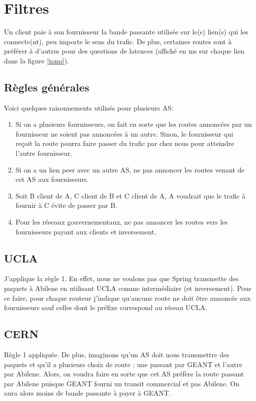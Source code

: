 \documentclass[a4paper, 12pt]{article}
\begin{document}
\section{Filtres}
Un client paie à son fournisseur la bande passante utilisée sur le(s) lien(s) qui les connecte(nt), peu importe le sens du trafic.
De plus, certaines routes sont à préférer à d'autres pour des questions de latences (affiché en ms sur chaque lien dans la figure \ref{topo}).
\subsection{Règles générales}
Voici quelques raisonnements utilisés pour plusieurs AS:
\begin{enumerate}
 \item Si on a plusieurs fournisseurs, on fait en sorte que les routes annoncées par un fournisseur ne soient pas annoncées à un autre.
 Sinon, le fournisseur qui reçoit la route pourra faire passer du trafic par chez nous pour atteindre l'autre fournisseur.
 \item Si on a un lien peer avec un autre AS, ne pas annoncer les routes venant de cet AS aux fournisseurs.
 \item Soit B client de A, C client de B et C client de A, A voudrait que le trafic à fournir à C évite de passer par B. %
 \item Pour les réseaux gouvernementaux, ne pas annoncer les routes vers les fournisseurs payant aux clients et inversement.
\end{enumerate}

\subsection{UCLA}
J'applique la règle 1.
En effet, nous ne voulons pas que Spring transmette des paquets à Abilene en utilisant UCLA comme intermédiaire (et inversement).
Pour ce faire, pour chaque routeur j'indique qu'aucune route ne doit être annoncée aux fournisseurs sauf celles dont le préfixe correspond au réseau UCLA.

\subsection{CERN}
Règle 1 appliquée. De plus,
imaginons qu'un AS doit nous transmettre des paquets et qu'il a plusieurs choix de route : une passant par GEANT et l'autre par Abilene.
Alors, on voudra faire en sorte que cet AS préfère la route passant par Abilene puisque GEANT fourni un transit commercial et pas Abilene.
On aura alors moins de bande passante à payer à GEANT.
\\
\end{document}
